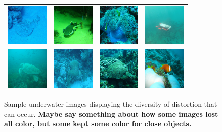 \documentclass[letterpaper, 10pt, conference]{ieeeconf}
\begin{document}
\begin{figure}
\centering
\begin{tabular}{p{1.7cm} p{1.7cm} p{1.7cm} p{1.7cm}}
   
   \includegraphics[width=0.8in]{n01496331_7428_f1} &
   \includegraphics[width=0.8in]{n01496331_16340_f1} &
   \includegraphics[width=0.8in]{n01914609_5148_f1} &
   \includegraphics[width=0.8in]{robot_f1} \\
   \includegraphics[width=0.8in]{n01664065_30279_f1} &
   \includegraphics[width=0.8in]{n01917289_5711_f1} &
   \includegraphics[width=0.8in]{n01917289_4087_f1} &
   \includegraphics[width=0.8in]{n02607072_10395_f1} \\

\end{tabular}
\label{fig:samples}
\caption{Sample underwater images displaying the diversity of distortion that can occur. \textbf{Maybe say something about how
some images lost all color, but some kept some color for close objects.}}
\end{figure}
\end{document}

